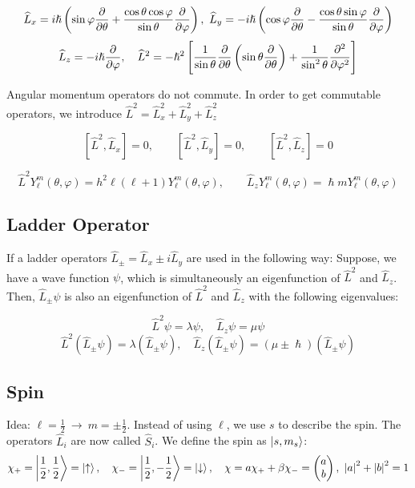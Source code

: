 \documentclass{article}
\begin{document}
\small {
$$\widehat{L}_x = i \hslash \left( \sin \varphi \frac{\partial }{\partial \theta} + \frac{\cos \theta \cos \varphi}{\sin \theta} \frac{\partial }{\partial \varphi}  \right), \ \widehat{L}_y = -i \hslash \left( \cos \varphi \frac{\partial }{\partial \theta} - \frac{\cos \theta \sin \varphi}{\sin \theta} \frac{\partial }{\partial \varphi} \right)$$
$$\widehat{L}_z = -i \hslash \frac{\partial }{\partial \varphi}, \quad \widehat{L}^2 = -\hslash^2 \left[\frac{1}{\sin \theta} \frac{\partial }{\partial \theta} \left( \sin \theta \frac{\partial }{\partial \theta} \right) + \frac{1}{\sin^2 \theta} \frac{\partial^2 }{\partial \varphi ^2} \right]$$
}

Angular momentum operators do not commute. In order to get commutable operators, we introduce $\hat L^2 = \hat L_x^2 + \hat L_y^2 + \hat L_z^2$

$$\left[\hat L^2,\hat L_x\right] = 0, \qquad \left[\hat L^2,\hat L_y\right] = 0, \qquad \left[\hat L^2,\hat L_z\right] = 0$$

$$\hat L^2 Y_\ell^m (\theta,\varphi) = h^2 \ell (\ell + 1) Y_\ell^m(\theta,\varphi), \qquad \hat L_z Y_\ell^m(\theta,\varphi) = \hslash m Y_\ell^m(\theta,\varphi)$$

\subsection{Ladder Operator}

If a ladder operators $\hat L_\pm = \hat L_x \pm i \hat L_y$ are used in the following way: Suppose, we have a wave function $\psi$, which is simultaneously an eigenfunction of $\hat L^2$ and $\hat L_z$. Then, $\hat L_\pm \psi$ is also an eigenfunction of $\hat L^2$ and $\hat L_z$ with the following eigenvalues:

$$\hat L^2 \psi = \lambda \psi, \quad \hat L_z \psi = \mu \psi$$
$$\hat L^2 (\hat L_\pm \psi) = \lambda (\hat L_\pm \psi), \quad \hat L_z (\hat L_\pm \psi) = (\mu \pm \hslash) (\hat L_\pm \psi)$$ 

\subsection{Spin}

Idea: $\ell = \frac12 \ \rightarrow \ m = \pm \frac12$. Instead of using $\ell$, we use $s$ to describe the spin. The operators $\hat L_i$ are now called $\hat S_i$. We define the spin as $\ket{s,m_s}$:
$$\chi_+ = \Ket{\frac12,\frac12} = \ket{\uparrow}, \quad \chi_- = \Ket{\frac12,-\frac12} = \ket{\downarrow}, \quad \chi = a \chi_+ + \beta \chi_- = \begin{pmatrix}a\\b\end{pmatrix}, \ \left| a \right|^2 + \left| b \right|^2 = 1$$
\end{document}
